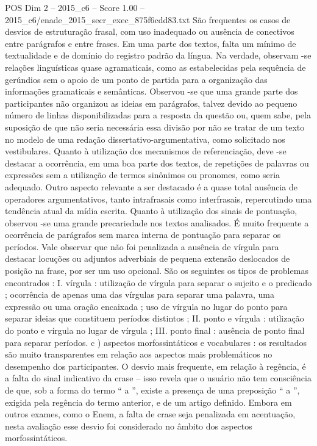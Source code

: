 \begin{textsample}{POS Dim 2 – 2015\_c6 – Score 1.00 – 2015\_c6/enade\_2015\_secr\_exec\_875f6cdd83.txt}
São frequentes os casos de desvios de estruturação frasal, com uso inadequado ou ausência de conectivos entre parágrafos e entre frases.
Em uma parte dos textos, falta um mínimo de textualidade e de domínio do registro padrão da língua.
Na verdade, observam -se relações linguísticas quase agramaticais, como as estabelecidas pela sequência de gerúndios sem o apoio de um ponto de partida para a organização das informações gramaticais e semânticas.
Observou -se que uma grande parte dos participantes não organizou as ideias em parágrafos, talvez devido ao pequeno número de linhas disponibilizadas para a resposta da questão ou, quem sabe, pela suposição de que não seria necessária essa divisão por não se tratar de um texto no modelo de uma redação dissertativo-argumentativa, como solicitado nos vestibulares.
Quanto à utilização dos mecanismos de referenciação, deve -se destacar a ocorrência, em uma boa parte dos textos, de repetições de palavras ou expressões sem a utilização de termos sinônimos ou pronomes, como seria adequado.
Outro aspecto relevante a ser destacado é a quase total ausência de operadores argumentativos, tanto intrafrasais como interfrasais, repercutindo uma tendência atual da mídia escrita.
Quanto à utilização dos sinais de pontuação, observou -se uma grande precariedade nos textos analisados.
É muito frequente a ocorrência de parágrafos sem marca interna de pontuação para separar os períodos.
Vale observar que não foi penalizada a ausência de vírgula para destacar locuções ou adjuntos adverbiais de pequena extensão deslocados de posição na frase, por ser um uso opcional.
São os seguintes os tipos de problemas encontrados : I. vírgula : utilização de vírgula para separar o sujeito e o predicado ; ocorrência de apenas uma das vírgulas para separar uma palavra, uma expressão ou uma oração encaixada ; uso de vírgula no lugar do ponto para separar ideias que constituem períodos distintos ; II. ponto e vírgula : utilização do ponto e vírgula no lugar de vírgula ; III. ponto final : ausência de ponto final para separar períodos. c ) aspectos morfossintáticos e vocabulares : os resultados são muito transparentes em relação aos aspectos mais problemáticos no desempenho dos participantes.
O desvio mais frequente, em relação à regência, é a falta do sinal indicativo da crase – isso revela que o usuário não tem consciência de que, sob a forma do termo “ a ”, existe a presença de uma preposição “ a ”, exigida pela regência do termo anterior, e de um artigo definido.
Embora em outros exames, como o Enem, a falta de crase seja penalizada em acentuação, nesta avaliação esse desvio foi considerado no âmbito dos aspectos morfossintáticos.

\end{textsample}
